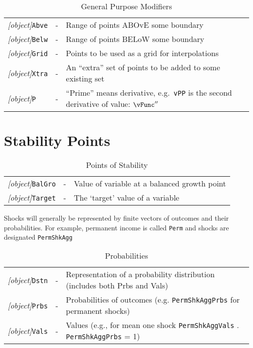 \documentclass[12pt]{\econtex}
\begin{document}
\begin{table}[ht]
\begin{tabular}{|>{\ttfamily}lcl|}
    \\ \textit{[object]}\texttt{Abve} & - & Range of points ABOvE some boundary
    \\ \textit{[object]}\texttt{Belw} & - & Range of points BELoW some boundary
    \\ \textit{[object]}\texttt{Grid} & - & Points to be used as a grid for interpolations
    \\ \textit{[object]}\texttt{Xtra} & - & An ``extra'' set of points to be added to some existing set
\\ \textit{[object]}\texttt{P} & - & ``Prime'' means derivative, e.g.\ \texttt{vPP} is the second derivative of value: $\vFunc^{\prime\prime}$
\\    \hline
  \end{tabular}
  \caption{General Purpose Modifiers}
  \label{table:General}
\end{table}	

\hypertarget{Stability-Points}{}
\section{Stability Points}
\begin{table}[ht]
\centering
  \begin{tabular}{|>{\ttfamily}lcl|} \hline 
     \textit{[object]}\texttt{BalGro} & - & Value of variable at a balanced growth point
    \\ \textit{[object]}\texttt{Target} & - & The `target' value of a variable \\ \hline
  \end{tabular}
  \caption{Points of Stability}
  \label{table:Stability}
\end{table}	


\medskip\medskip
\hypertarget{Shocks}{}
Shocks will generally be represented by finite vectors of outcomes and their probabilities.  For example, permanent income is called \texttt{Perm} and shocks are designated \texttt{PermShkAgg}
\begin{table}[ht]
  \centering
  \begin{tabular}{|>{\ttfamily}ccl|} 		
    \hline
    \textit{[object]}\texttt{Dstn} & - & Representation of a probability distribution (includes both Prbs and Vals)
    \\ \textit{[object]}\texttt{Prbs} & - & Probabilities of outcomes (e.g. \texttt{PermShkAggPrbs} for permanent shocks) 
    \\ \textit{[object]}\texttt{Vals} & - & Values (e.g., for mean one shock \texttt{PermShkAggVals} . \texttt{PermShkAggPrbs} = 1)                                            
    \\ 	\hline
  \end{tabular}
  \caption{Probabilities}
  \label{table:Probabilities}
\end{table}	
\end{document}
